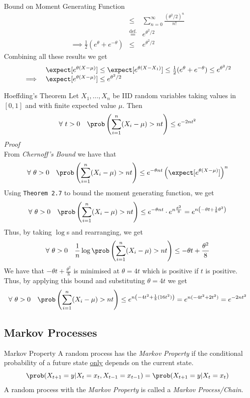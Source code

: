 \documentclass[11pt,a4paper]{article}
\begin{document}
\begin{theorem}{Bound on Moment Generating Function}
\[\begin{array}{rclll}
  &\leq&\displaystyle\sum_{n=0}^\infty\frac{(\theta^2/2)^n}{n!}\\
  &\overset{\text{def.}}{=}&e^{\theta^2/2}\\
  \implies\frac12(e^\theta+e^{-\theta})&\leq&e^{\theta^2/2}
  \end{array}\]
  Combining all these results we get
  \[ \begin{array}{rl}
  &\expect[e^{\theta(X-\mu)}]\leq\expect[e^{\theta(X-X_1)}]\leq\frac12(e^\theta+e^{-\theta})\leq e^{\theta^2/2}\\
  \implies&\expect[e^{\theta(X-\mu)}]\leq e^{\theta^2/2}
  \end{array}\]
  \proved
\end{theorem}

\begin{theorem}{Hoeffding's Theorem}
  Let $X_1,\dots,X_n$ be IID random variables taking values in $[0,1]$ and with finite expected value $\mu$. Then
  \[ \forall\ t>0\quad\prob\left(\sum_{i=1}^n(X_i-\mu)>nt\right)\leq e^{-2nt^2} \]
  \textit{Proof}\\
  From \textit{Chernoff's Bound} we have that
  \[ \forall\ \theta>0\quad\prob\left(\sum_{i=1}^n(X_i-\mu)>nt\right)\leq e^{-\theta nt}\left(\expect[e^{\theta(X-\mu)}]\right)^n \]
  Using \texttt{Theorem 2.7} to bound the moment generating function, we get
  \[ \forall\ \theta>0\quad\prob\left(\sum_{i=1}^n(X_i-\mu)>nt\right)\leq e^{-\theta nt}\cdot e^{n\frac{\theta^2}8}=e^{n\left(-\theta t+\frac{1}8\theta^2\right)} \]
  Thus, by taking $\log$s and rearranging, we get
  \[ \forall\ \theta>0\quad\frac1n\log\prob\left(\sum_{i=1}^n(X_i-\mu)>nt\right)\leq-\theta t+\frac{\theta^2}8 \]
  We have that $-\theta t+\frac{\theta^2}8$ is minimised at $\theta=4t$ which is positive if $t$ is positive. Thus, by applying this bound and substituting $\theta=4t$ we get
  \[ \forall\ \theta>0\quad\prob\left(\sum_{i=1}^n(X_i-\mu)>nt\right)\leq e^{n\left(-4t^2+\frac{1}8(16t^2)\right)}=e^{n(-4t^2+2t^2)}=e^{-2nt^2} \]
  \proved
\end{theorem}

\subsection{Markov Processes}

\begin{definition}{Markov Property}
  A random process has the \textit{Markov Property} if the conditional probability of a future state \underline{only} depends on the current state.
  \[ \prob(X_{t+1}=y|X_{t}=x_t,X_{t-1}=x_{t-1})=\prob(X_{t+1}=y|X_t=x_t) \]
  A random process with the \textit{Markov Property} is called a \textit{Markov Process/Chain}.
\end{definition}
\end{document}
